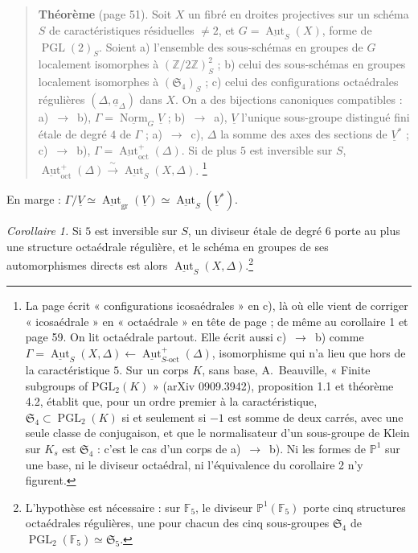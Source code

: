 \documentclass[11pt,a4paper]{article}
\begin{document}
\begin{quote}
\textbf{Théorème} (page 51). Soit $X$ un fibré en droites projectives sur un
schéma $S$ de caractéristiques résiduelles $\neq 2$, et $G =
\underline{\operatorname{Aut}}_S(X)$, forme de $\operatorname{PGL}(2)_S$. Soient
a) l'ensemble des sous-schémas en groupes de $G$ localement isomorphes à
$(\mathbb{Z}/2\mathbb{Z})^2_S$ ; b) celui des sous-schémas en groupes
localement isomorphes à $(\mathfrak{S}_4)_S$ ; c) celui des configurations
octaédrales régulières $(\Delta, \underline{a}_\Delta)$ dans $X$. On a des
bijections canoniques compatibles :
a)~$\to$~b), $\Gamma = \underline{\operatorname{Norm}}_G \underline{V}$ ;
b)~$\to$~a), $\underline{V}$ l'unique sous-groupe distingué fini étale de degré
$4$ de $\Gamma$ ; a)~$\to$~c), $\Delta$ la somme des axes des sections de
$\underline{V}^{*}$ ; c)~$\to$~b), $\Gamma =
\underline{\operatorname{Aut}}^{+}_{\mathrm{oct}}(\Delta)$. Si de plus $5$ est
inversible sur $S$, $\underline{\operatorname{Aut}}^{+}_{\mathrm{oct}}(\Delta)
\xrightarrow{\;\sim\;} \underline{\operatorname{Aut}}_S(X, \Delta)$.
\footnote{La page écrit « configurations icosaédrales » en c), là où elle vient
de corriger « icosaédrale » en « octaédrale » en tête de page ; de même au
corollaire 1 et page 59. On lit octaédrale partout. Elle écrit aussi c)~$\to$~b)
comme $\Gamma = \underline{\operatorname{Aut}}_S(X, \Delta) \leftarrow
\underline{\operatorname{Aut}}^{+}_{S\text{-oct}}(\Delta)$, isomorphisme qui
n'a lieu que hors de la caractéristique $5$. Sur un corps $K$, sans base,
A.~Beauville, « Finite subgroups of $\mathrm{PGL}_2(K)$ » (arXiv 0909.3942),
proposition 1.1 et théorème 4.2, établit que, pour un ordre premier à la
caractéristique, $\mathfrak{S}_4 \subset \operatorname{PGL}_2(K)$ si et
seulement si $-1$ est somme de deux carrés, avec une seule classe de
conjugaison, et que le normalisateur d'un sous-groupe de Klein sur $K_s$ est
$\mathfrak{S}_4$ : c'est le cas d'un corps de a)~$\to$~b). Ni les formes de
$\mathbb{P}^1$ sur une base, ni le diviseur octaédral, ni l'équivalence du
corollaire 2 n'y figurent.}
\end{quote}

En marge :
$\Gamma / \underline{V} \simeq \underline{\operatorname{Aut}}_{\text{gr}}(\underline{V})
\simeq \underline{\operatorname{Aut}}_S(\underline{V}^{*})$.

\emph{Corollaire 1.} Si $5$ est inversible sur $S$, un diviseur étale de degré
$6$ porte au plus une structure octaédrale régulière, et le schéma en groupes
de ses automorphismes directs est alors $\underline{\operatorname{Aut}}_S(X,
\Delta)$.\footnote{L'hypothèse est nécessaire : sur $\mathbb{F}_5$, le diviseur
$\mathbb{P}^1(\mathbb{F}_5)$ porte cinq structures octaédrales régulières, une
pour chacun des cinq sous-groupes $\mathfrak{S}_4$ de
$\operatorname{PGL}_2(\mathbb{F}_5) \simeq \mathfrak{S}_5$.}
\end{document}
